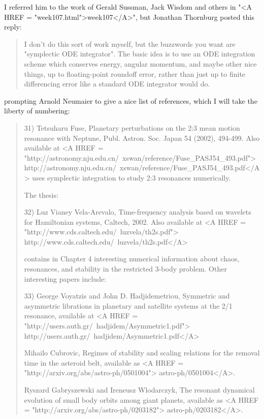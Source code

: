I referred him to the work of Gerald Sussman, Jack Wisdom and others in 
"<A HREF = "week107.html">week107</A>", but Jonathan Thornburg
posted this reply:

\begin{quote}
I don't do this sort of work myself, but the buzzwords you want are
"symplectic ODE integrator".  
The basic idea is to use an ODE integration
scheme which conserves energy, angular momentum, and maybe other nice
things, up to floating-point roundoff error, rather than just up to
finite differencing error like a standard ODE integrator would do.
\end{quote}

prompting Arnold Neumaier to give a nice list of references, which
I will take the liberty of numbering:

\begin{quote}
31) Tetsuharu Fuse, 
Planetary perturbations on the 2:3 mean motion resonance with Neptune,
Publ. Astron. Soc. Japan 54 (2002), 494-499.  Also available at
<A HREF = "http://astronomy.nju.edu.cn/~xswan/reference/Fuse_PASJ54_493.pdf">
http://astronomy.nju.edu.cn/~xswan/reference/Fuse_PASJ54_493.pdf</A>
uses symplectic integration to study 2:3 resonances numerically.
 
The thesis:

32) Luz Vianey Vela-Arevalo, 
Time-frequency analysis based on wavelets for Hamiltonian systems,
Caltech, 2002.  Also available at
<A HREF = "http://www.cds.caltech.edu/~luzvela/th2s.pdf">
http://www.cds.caltech.edu/~luzvela/th2s.pdf</A>

contains in Chapter 4 interesting numerical information about chaos,
resonances, and stability in the restricted 3-body problem. Other
interesting papers include:
 
33) 
George Voyatzis and John D. Hadjidemetriou,
Symmetric and asymmetric librations in planetary and satellite
systems at the 2/1 resonance, available at
<A HREF = "http://users.auth.gr/~hadjidem/Asymmetric1.pdf">
http://users.auth.gr/~hadjidem/Asymmetric1.pdf</A> 
 
Mihailo Cubrovic, 
Regimes of stability and scaling relations for the removal time
in the asteroid belt, available as
<A HREF = "http://arxiv.org/abs/astro-ph/0501004">
astro-ph/0501004</A>.

Ryszard Gabryszewski and Ireneusz Wlodarczyk,
The resonant dynamical evolution of small body orbits
among giant planets, available as
<A HREF = "http://arxiv.org/abs/astro-ph/0203182">
astro-ph/0203182</A>. 
 

\end{quote}
